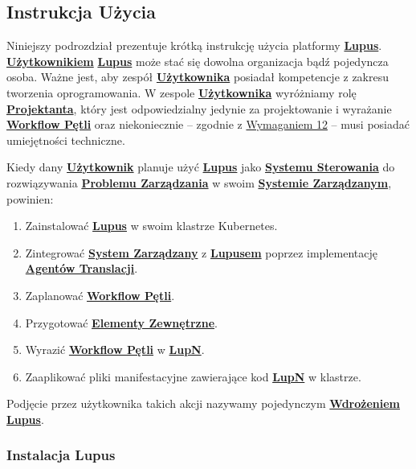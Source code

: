 \subsection{Instrukcja Użycia}

Niniejszy podrozdział prezentuje krótką instrukcję użycia platformy \hyperlink{def:lupus}{\textbf{Lupus}}. \hyperlink{def:uzytkownik}{\textbf{Użytkownikiem}} \hyperlink{def:lupus}{\textbf{Lupus}} może stać się dowolna organizacja bądź pojedyncza osoba. Ważne jest, aby zespół \hyperlink{def:uzytkownik}{\textbf{Użytkownika}} posiadał kompetencje z zakresu tworzenia oprogramowania. W zespole \hyperlink{def:uzytkownik}{\textbf{Użytkownika}} wyróżniamy rolę \hyperlink{def:projektant}{\textbf{Projektanta}}, który jest odpowiedzialny jedynie za projektowanie i wyrażanie \hyperlink{def:workflow-petli}{\textbf{Workflow Pętli}} oraz niekoniecznie – zgodnie z \hyperref[req:12]{Wymaganiem 12} – musi posiadać umiejętności techniczne. 

Kiedy dany \hyperlink{def:uzytkownik}{\textbf{Użytkownik}} planuje użyć \hyperlink{def:lupus}{\textbf{Lupus}} jako \hyperlink{def:system-sterowania}{\textbf{Systemu Sterowania}} do rozwiązywania \hyperlink{def:problem-zarzadzania}{\textbf{Problemu Zarządzania}} w swoim \hyperlink{def:system-zarzadzany}{\textbf{Systemie Zarządzanym}}, powinien:
\begin{enumerate}
    \item Zainstalować \hyperlink{def:lupus}{\textbf{Lupus}} w swoim klastrze Kubernetes.
    \item Zintegrować \hyperlink{def:system-zarzadzany}{\textbf{System Zarządzany}} z \hyperlink{def:lupus}{\textbf{Lupusem}} poprzez implementację \hyperlink{def:agent-translacji}{\textbf{Agentów Translacji}}.
    \item Zaplanować \hyperlink{def:workflow-petli}{\textbf{Workflow Pętli}}.
    \item Przygotować \hyperlink{def:element-zewnetrzny}{\textbf{Elementy Zewnętrzne}}.
    \item Wyrazić \hyperlink{def:workflow-petli}{\textbf{Workflow Pętli}} w \hyperlink{def:lupn}{\textbf{LupN}}.
    \item Zaaplikować pliki manifestacyjne zawierające kod \hyperlink{def:lupn}{\textbf{LupN}} w klastrze.
\end{enumerate}

Podjęcie przez użytkownika takich akcji nazywamy pojedynczym \hyperlink{def:wdrozenie-lupus}{\textbf{Wdrożeniem Lupus}}.

\subsubsection{Instalacja Lupus}


